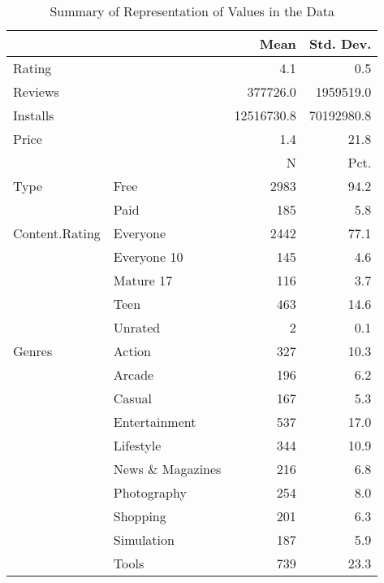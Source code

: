\documentclass[
]{article}
\begin{document}
\begin{table}

\caption{\label{tab:unnamed-chunk-4}Summary of Representation of Values in the Data}
\centering
\begin{tabular}[t]{llrr}
\toprule
  &    & Mean & Std. Dev.\\
\midrule
Rating &  & 4.1 & 0.5\\
Reviews &  & 377726.0 & 1959519.0\\
Installs &  & 12516730.8 & 70192980.8\\
Price &  & 1.4 & 21.8\\
\midrule
 &  & N & Pct.\\
Type & Free & 2983 & 94.2\\
 & Paid & 185 & 5.8\\
Content.Rating & Everyone & 2442 & 77.1\\
 & Everyone 10 & 145 & 4.6\\
 & Mature 17 & 116 & 3.7\\
 & Teen & 463 & 14.6\\
 & Unrated & 2 & 0.1\\
Genres & Action & 327 & 10.3\\
 & Arcade & 196 & 6.2\\
 & Casual & 167 & 5.3\\
 & Entertainment & 537 & 17.0\\
 & Lifestyle & 344 & 10.9\\
 & News \& Magazines & 216 & 6.8\\
 & Photography & 254 & 8.0\\
 & Shopping & 201 & 6.3\\
 & Simulation & 187 & 5.9\\
 & Tools & 739 & 23.3\\
\bottomrule
\end{tabular}
\end{table}
\end{document}
